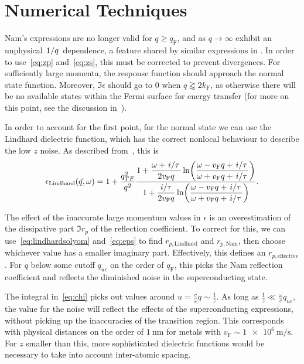 \documentclass{article}
\newcommand{\vf}{v_{\mathrm{F}}}
\begin{document}
\section{Numerical Techniques \label{sec:technical}}

	Nam's expressions are no longer valid for $q \geq q_\mathrm{F}$, and as $q \rightarrow \infty$ exhibit an unphysical $\flatfrac{1}{q}$ dependence, a feature shared by similar expressions in \cite{AGD}.
	In order to use~\eqref{eq:zp} and~\eqref{eq:zs}, this must be corrected to prevent divergences.
	For sufficiently large momenta, the response function should approach the normal state function.
	Moreover, $\Im \epsilon$ should go to $0$ when $q \gtrapprox 2 k_{\mathrm{F}}$, as otherwise there will be no available states within the Fermi surface for energy transfer (for more on this point, see the discussion in~\cite{FetterWalecka}).

	In order to account for the first point, for the normal state we can use the Lindhard dielectric function, which has the correct nonlocal behaviour to describe the low $z$ noise\cite{QubitRelax}.
	As described from~\cite{SolyomV3}, this is
	\begin{equation}
		\epsilon_{\mathrm{Lindhard}}(\vec{q}, \omega) = 1 + \frac{q_{TF}^2}{q^2}\frac{\displaystyle 1 + \frac{\omega + \flatfrac{i}{\tau}}{2 \vf q} \ln(\frac{\omega - \vf q + \flatfrac{i}{\tau}}{\omega + \vf q + \flatfrac{i}{\tau}})}{\displaystyle 1 + \frac{\flatfrac{i}{\tau}}{2 \vf q} \ln(\frac{\omega - \vf q + \flatfrac{i}{\tau}}{\omega + \vf q + \flatfrac{i}{\tau}})}. \label{eq:lindhardsolyom}
	\end{equation}

	The effect of the inaccurate large momentum values in $\epsilon$ is an overestimation of the dissipative part $\Im r_p$ of the reflection coefficient.
	To correct for this, we can use~\eqref{eq:lindhardsolyom} and~\eqref{eq:eps} to find $r_{p\mathrm{, Lindhard}}$ and $r_{p\mathrm{, Nam}}$, then choose whichever value has a smaller imaginary part.
	Effectively, this defines an $r_{p\mathrm{, effective}}$.
	For $q$ below some cutoff $q_{uc}$ on the order of $q_{\mathrm{F}}$, this picks the Nam reflection coefficient and reflects the diminished noise in the superconducting state.

	The integral in~\eqref{eq:chi} picks out values around $u = \frac{c}{\omega} q \sim \frac{1}{z}$.
	As long as $\frac{1}{z} \ll \frac{\omega}{c} q_{uc}$, the value for the noise will reflect the effects of the superconducting expressions, without picking up the inaccuracies of the transition region.
	This corresponds with physical distances on the order of $\SI{1}{\nm}$ for metals with $\vf \sim \SI{1e6}{\m\per\s}$.
	For $z$ smaller than this, more sophisticated dielectric functions would be necessary to take into account inter-atomic spacing.
\end{document}

